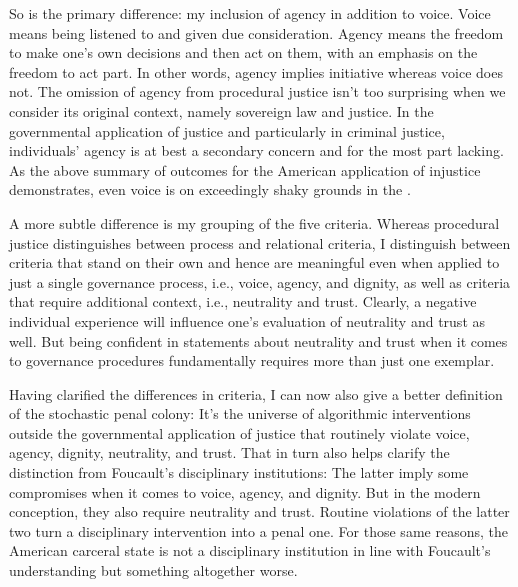 So is the primary difference: my inclusion of agency in addition to voice. Voice
means being listened to and given due consideration. Agency means the freedom to
make one's own decisions and then act on them, with an emphasis on the freedom
to act part. In other words, agency implies initiative whereas voice does not.
The omission of agency from procedural justice isn't too surprising when we
consider its original context, namely sovereign law and justice. In the
governmental application of justice and particularly in criminal justice,
individuals' agency is at best a secondary concern and for the most part
lacking. As the above summary of outcomes for the American application of
injustice demonstrates, even voice is on exceedingly shaky grounds in the
.

A more subtle difference is my grouping of the five criteria. Whereas procedural
justice distinguishes between process and relational criteria, I distinguish
between criteria that stand on their own and hence are meaningful even when
applied to just a single governance process, i.e., voice, agency, and dignity,
as well as criteria that require additional context, i.e., neutrality and trust.
Clearly, a negative individual experience will influence one's evaluation of
neutrality and trust as well. But being confident in statements about neutrality
and trust when it comes to governance procedures fundamentally requires more
than just one exemplar.

Having clarified the differences in criteria, I can now also give a better
definition of the stochastic penal colony: It's the universe of algorithmic
interventions outside the governmental application of justice that routinely
violate voice, agency, dignity, neutrality, and trust. That in turn also helps
clarify the distinction from Foucault's disciplinary institutions: The latter
imply some compromises when it comes to voice, agency, and dignity. But in the
modern conception, they also require neutrality and trust. Routine violations of
the latter two turn a disciplinary intervention into a penal one. For those same
reasons, the American carceral state is not a disciplinary institution in line
with Foucault's understanding but something altogether worse.
